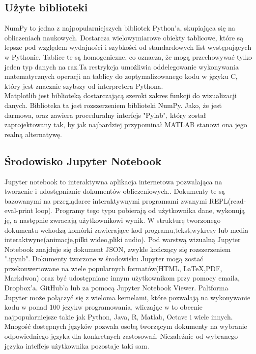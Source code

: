 \documentclass[12pt,twoside]{article}
\begin{document}
\subsection{Użyte biblioteki}

NumPy to jedna z najpopularniejszych bibliotek Python'a, skupiająca się na obliczeniach naukowych. Dostarcza wielowymiarowe obiekty tablicowe, które są lepsze pod względem wydajności i szybkości od standardowych list występujących w Pythonie\cite{Numpy_1}. Tablice te są homogeniczne, co oznacza, że mogą przechowywać tylko jeden typ danych na raz.Ta restrykcja umożliwia oddelegowanie wykonywania matematycznych operacji na tablicy do zoptymalizowanego kodu w języku C, który jest znacznie szybszy od interpretera Pythona\cite{Numpy_2}.\\

Matplotlib jest biblioteką dostarczającą szeroki zakres funkcji do wizualizacji danych. Biblioteka ta jest rozszerzeniem biblioteki NumPy. Jako, że jest darmowa, oraz zawiera proceduralny interfejs "Pylab", który został zaprojektowany tak, by jak najbardziej przypominał MATLAB stanowi ona jego realną alternatywę.

\subsection{Środowisko Jupyter Notebook}

Jupyter notebook to interaktywna aplikacja internetowa pozwalająca na tworzenie i udostępnianie dokumentów obliczeniowych.\cite{Notebook_1}.
Dokumenty te są bazowanymi na przeglądarce interaktywnymi programami zwanymi REPL(read-eval-print loop). Programy tego typu pobierają od użytkownika dane, wykonują ję, a następnie zwracają użytkownikowi wynik\cite{Notebook_2}.
W strukturę tworzonego dokumentu wchodzą komórki zawierające kod programu,tekst,wykresy lub media interaktwyne(animacje,pilki wideo,pliki audio). Pod warstwą wizualną Jupyter Notebook znajduje się dokument JSON, zwykle kończący się rozszerzeniem ".ipynb".
	Dokumenty tworzone w środowisku Jupyter mogą zostać przekonwertowane na wiele popularnych formatów(HTML, LaTeX,PDF, Markdwon) oraz być udostępniane innym użytkownikom przy pomocy emaila, Dropbox'a. GitHub'a lub za pomocą Jupyter Notebook Viewer\cite{Notebook_3}.
\newline
Paltforma Jupyter może połączyć się z wieloma kernelami, które pozwalają na wykonywanie kodu w ponad 100 jezykw programowania, wliczając w to obecnie najpopularniejsze takie jak Python, Java, R, Matlab, Octave i wiele innych\cite{Notebook_4}. Mnogość dostępnych języków pozwala osobą tworzącym dokumenty na wybranie odpowiedniego języka dla konkretnych zastosowań. Niezależnie od wybranego języka inteffejs użytkownika pozostaje taki sam.
\end{document}
